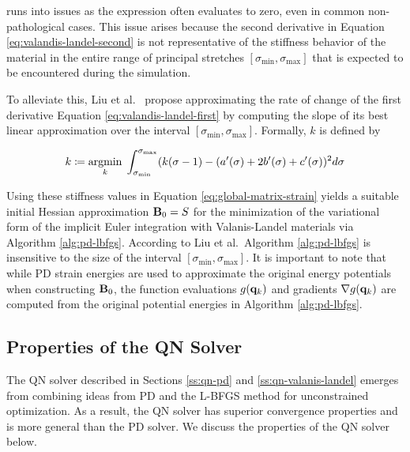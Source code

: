 \noindent runs into issues as the expression often evaluates to zero, even in common non-pathological cases. This issue arises because
the second derivative in Equation \ref{eq:valandis-landel-second} is not representative of the stiffness behavior of the material in the 
entire range of principal stretches $[\sigma_{\text{min}}, \sigma_{\text{max}}]$ that is expected to be encountered during the simulation.

To alleviate this, Liu et al.\ \cite{liu2017} propose approximating the rate of change of the first derivative Equation \ref{eq:valandis-landel-first}
by computing the slope of its best linear approximation over the interval $[\sigma_{\text{min}}, \sigma_{\text{max}}]$. Formally, $k$ is 
defined by

\begin{equation}\label{eq:valanis-landel-k}
    k \coloneqq \underset{k}{\operatorname{argmin}}\; \int^{\sigma_{\text{max}}}_{\sigma_{\text{min}}} (k(\sigma - 1) - (a^{\prime}(\sigma) + 2b^{\prime}(\sigma) + 
    c^{\prime}(\sigma))^2 d\sigma
\end{equation}

\noindent Using these stiffness values in Equation \ref{eq:global-matrix-strain} yields a suitable initial Hessian approximation $\mathbf{B}_0 = S$ for
the minimization of the variational form of the implicit Euler integration with Valanis-Landel materials via Algorithm \ref{alg:pd-lbfgs}. According
to Liu et al.\ Algorithm \ref{alg:pd-lbfgs} is insensitive to the size of the interval $[\sigma_{\text{min}}, \sigma_{\text{max}}]$. It is important
to note that while PD strain energies are used to approximate the original energy potentials when constructing $\mathbf{B}_0$, the function
evaluations $g(\mathbf{q}_k)$ and gradients $\nabla g(\mathbf{q}_k)$ are computed from the original potential energies in Algorithm \ref{alg:pd-lbfgs}.

\subsection{Properties of the QN Solver}\label{ss:properties-qn}
The QN solver described in Sections \ref{ss:qn-pd} and \ref{ss:qn-valanis-landel} emerges from combining ideas from PD and the L-BFGS method for 
unconstrained optimization. As a result, the QN solver has superior convergence properties and is more general than the PD solver. We discuss the 
properties of the QN solver below.

